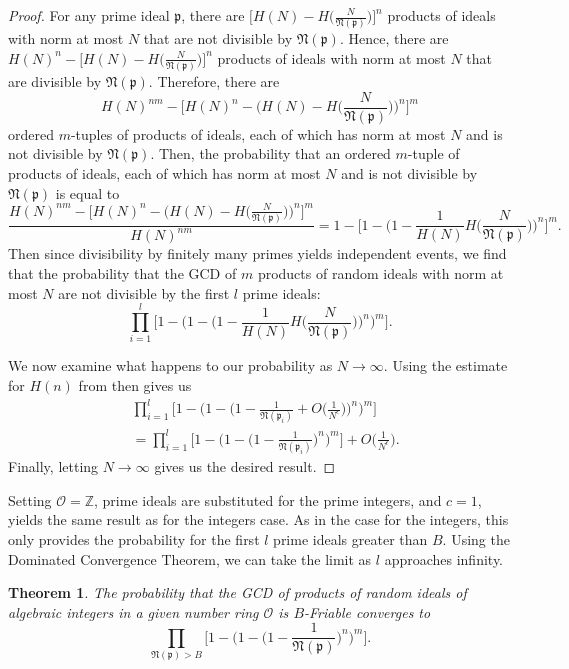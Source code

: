 \documentclass[10pt,a4paper]{article}
\newtheorem{theorem}{Theorem}[section]
\theoremstyle{definition}
\theoremstyle{remark}
\newcommand{\f}[1]{\mathfrak{#1}}
\begin{document}
\begin{proof}
For any prime ideal $\mathfrak{p}$, there are $\bigl[H(N)-H\bigl(\frac{N}{\f{N(p)}}\bigr)\bigr]^n$ products of ideals with norm at most $N$ that are not divisible by $\f{N(p)}$. Hence, there are  $H(N)^n-\bigl[H(N)-H\bigl(\frac{N}{\f{N(p)}}\bigr)\bigr]^n$ products of ideals with norm at most \(N\) that are divisible by $\f{N(p)}$. Therefore, there are 
$$H(N)^{nm}-\Big[H(N)^n - \Big(H(N) - H\Big(\frac{N}{\f{N(p)}}\Big)\Big)^n\Big]^m$$
ordered $m$-tuples of products of ideals, each of which has norm at most $N$ and is not divisible by $\f{N(p)}$. Then, the probability that an ordered $m$-tuple of products of ideals, each of which has norm at most $N$ and is not divisible by $\f{N(p)}$ is equal to
$$\frac{H(N)^{nm}-\Big[H(N)^n - \Big(H(N) - H\Big(\frac{N}{\f{N(p)}}\Big)\Big)^n\Big]^m}{H(N)^{nm}} = 1 - \Big[1 - \Big(1 - \frac{1}{H(N)} H\Big(\frac{N}{\f{N(p)}}\Big)\Big)^n\Big]^m.$$
Then since divisibility by finitely many primes yields independent events, we find that the probability that the GCD of $m$ products of random ideals with norm at most $N$ are not divisible by the first $l$ prime ideals:
$$\prod_{i=1}^{l} \Big[1 - \Big(1 - \Big(1 - \frac{1}{H(N)} H\Big(\frac{N}{\f{N(p)}}\Big)\Big)^n \Big)^m \Big].$$

We now examine what happens to our probability as $N \to \infty$. Using the estimate for $H(n)$ from \cite{marcus_number_2012} then gives us
\begin{align*}
&\prod_{i=1}^{l} \Big[1 - \Big(1 - \Big(1 - \frac{1}{\f{N}(\f{p}_i)} + O\Big(\frac{1}{N^{\epsilon}}\Big) \Big)^n \Big)^m\Big]\\
&=\prod_{i=1}^{l} \Big[1 - \Big(1 - \Big(1 - \frac{1}{\f{N}(\f{p}_i)}\Big)^n \Big)^m \Big] + O\Big(\frac{1}{N^{\epsilon}}\Big).
\end{align*}
Finally, letting $N\to\infty$ gives us the desired result. 
\end{proof}

Setting \(\mathcal{O}=\mathbb{Z}\), prime ideals are substituted for the prime integers, and \(c=1\), yields the same result as for the integers case. As in the case for the integers, this only provides the probability for the first \(l\) prime ideals greater than \(B\). Using the Dominated Convergence Theorem, we can take the limit as \(l\) approaches infinity.

\begin{theorem}
The probability that the GCD of products of random ideals of algebraic integers in a given number ring $\mathcal{O}$ is $B$-Friable converges to
$$\prod_{\f{N}(\f{p})>B}\Big[1 - \Big(1 - \Big(1 - \frac{1}{\f{N}(\f{p})}\Big)^n \Big)^m \Big].$$
\end{theorem}
\end{document}
